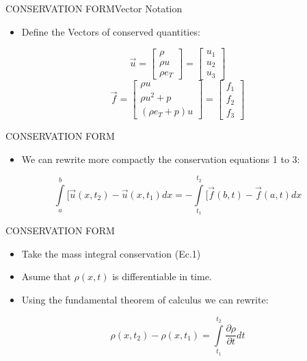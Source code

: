 \documentclass{beamer}
\begin{document}
\begin{frame}{CONSERVATION FORM}{Vector Notation}
  \begin{itemize}
   \item Define the Vectors of conserved quantities:
  \end{itemize}
  \begin{equation}
    \vec{u} = \begin{bmatrix}
      {\rho} \\
      {\rho}{u} \\
      {\rho}{e_T}
    \end{bmatrix}=\begin{bmatrix}
      u_1\\ 
      u_2\\ 
      u_3
      \end{bmatrix}
  \end{equation}
  \begin{equation}
   \vec{f} = \begin{bmatrix}
      {\rho}{u} \\
      {\rho}{u^2}+p \\
      ({\rho}{e_T}+p)u
    \end{bmatrix}=\begin{bmatrix}
      f_1\\ 
      f_2\\ 
      f_3
      \end{bmatrix}
  \end{equation}
\end{frame}

\begin{frame}{CONSERVATION FORM}
  \begin{itemize}
   \item We can rewrite more compactly the conservation equations 1 to 3:
  \end{itemize}
  \begin{equation}
   \int\limits_a^b[\vec{u}(x,t_2)-\vec{u}(x,t_1)dx = -\int\limits_{t_1}^{t_2}[\vec{f}(b,t)-\vec{f}(a,t)dx
  \end{equation}
\end{frame}

\begin{frame}{CONSERVATION FORM}
  \begin{itemize}
   \item Take the mass integral conservation (Ec.1)
   \item Asume that $\rho(x,t)$ is differentiable in time. 
   \item Using the fundamental theorem of calculus we can rewrite:
  \end{itemize}
  \begin{equation}
    {\rho}(x,t_2)-{\rho}(x,t_1)=\int\limits_{t_1}^{t_2} \frac{\partial{\rho}}{\partial{t}}dt
  \end{equation}
\end{frame}
\end{document}
